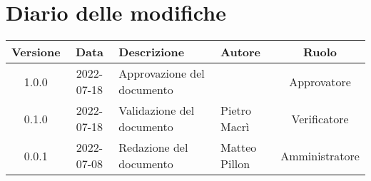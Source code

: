 \section*{Diario delle modifiche}
	\begin{center}
	\renewcommand{\arraystretch}{1.8} %
	\begin{tabular}{ |c|c|m{12em}|m{7em}|c| }
	\hline
	\textbf{Versione} & \textbf{Data} & \textbf{Descrizione} &  \textbf{Autore} &  \textbf{Ruolo} \\ %
	\hline
	  1.0.0  & 2022-07-18 & Approvazione del documento & \docApprovazione & Approvatore\\
	\hline
    0.1.0 & 2022-07-18 & Validazione del documento & Pietro \newline Macrì & Verificatore\\
	\hline
    0.0.1 & 2022-07-08 & Redazione del documento & Matteo \newline Pillon & Amministratore\\ %
	\hline
	\end{tabular}
	\end{center}
	\newpage